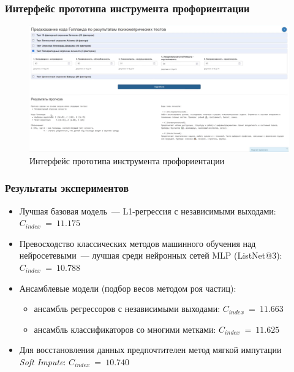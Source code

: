 \documentclass
  [ russian
  , aspectratio=169 %
  ] {beamer}
\begin{document}
\begin{frame}
    \frametitle{Интерфейс прототипа инструмента профориентации}
    \begin{figure}
        \centering
        \includegraphics[width=1.0\linewidth]{figures/UI2.png}
        \caption{Интерфейс прототипа инструмента профориентации}
        \label{fig:ui2}
    \end{figure}
\end{frame}


\begin{frame}
    \frametitle{Результаты экспериментов}
    \begin{itemize}
        \item Лучшая базовая модель~--- L1-регрессия с независимыми выходами:\\$C_{index}~=~11.175$
        
        \vspace{0.5em}
        \item Превосходство классических методов машинного обучения над нейросетевыми~--- лучшая среди нейронных сетей MLP (ListNet@3): $C_{index}~=~10.788$

        \vspace{0.5em}
        \item Ансамблевые модели (подбор весов методом роя частиц): 
        \begin{itemize}
            \item ансамбль регрессоров с независимыми выходами: $C_{index}~=~11.663$
            \item ансамбль классификаторов со многими метками: $C_{index}~=~11.625$
        \end{itemize}

        \vspace{0.5em}
        \item Для восстановления данных предпочтителен метод мягкой импутации\\\emph{Soft Impute}: $C_{index}~=~10.740$
    \end{itemize}
\end{frame}
\end{document}
